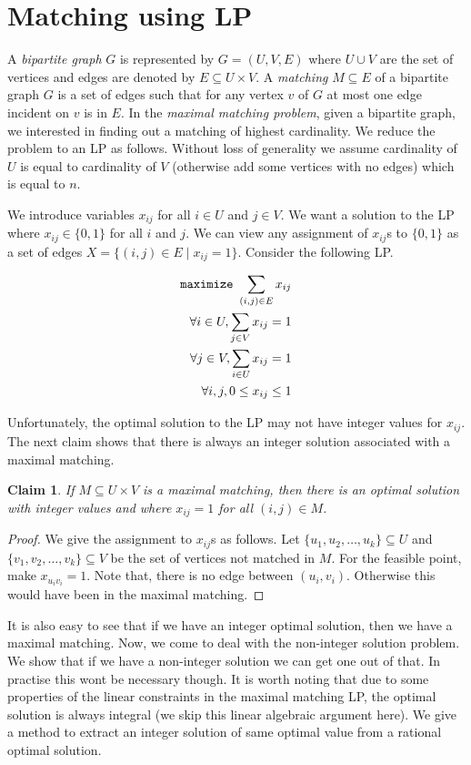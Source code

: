 \documentclass[12pt,
    driverfallback=dvipdfm,
 	openany,
    a4paper,
    toc=bibliography,
    twoside,
    numbers=noenddot]{book}              %
\newtheorem{claim}[theorem]{Claim}
\begin{document}
\section{Matching using LP}
A \emph{bipartite graph} $G$ is represented by $G=(U,V,E)$ where $U \cup V$ are the set of vertices and edges are denoted by $E \subseteq U \times V$. A \emph{matching} $M \subseteq E$ of a bipartite graph $G$ is a set of edges such that for any vertex $v$ of $G$ at most one edge incident on $v$ is in $E$. In the \emph{maximal matching problem}, given a bipartite graph, we interested in finding out a matching of highest cardinality. We reduce the problem to an LP as follows. Without loss of generality we assume cardinality of $U$ is equal to cardinality of $V$ (otherwise add some vertices with no edges) which is equal to $n$. 

We introduce variables $x_{ij}$ for all $i \in U$ and $j \in V$. We want a solution to the LP where $x_{ij} \in \{0,1\}$ for all $i$ and $j$. We can view any assignment of $x_{ij}$s to $\{0,1\}$ as a set of edges $X = \{(i,j) \in E \mid x_{ij}=1\}$. Consider the following LP.

\begin{align*}
\mathtt{maximize} ~\sum_{(i,j) \in E} x_{ij} \\
\forall i \in U, \sum_{j \in V} x_{ij}=1 \\
\forall j \in V, \sum_{i \in U} x_{ij}=1 \\
\forall i,j, 0 \leq x_{ij} \leq 1 
\end{align*}

Unfortunately, the optimal solution to the LP may not have integer values for $x_{ij}$. The next claim shows that there is always an integer solution associated with a maximal matching.
\begin{claim}
If $M \subseteq U \times V$ is a maximal matching, then there is an optimal solution with integer values and where $x_{ij}=1$ for all $(i,j) \in M$.
\end{claim}
\begin{proof}
We give the assignment to $x_{ij}$s as follows. Let $\{u_1, u_2, \dots, u_k \} \subseteq U$ and $\{v_1, v_2, \dots, v_k \} \subseteq V$  be the set of vertices not matched in $M$. For the feasible point, make $x_{u_i v_i} = 1$. Note that, there is no edge between $(u_i,v_i)$. Otherwise this would have been in the maximal matching.
\end{proof}

It is also easy to see that if we have an integer optimal solution, then we have a maximal matching. Now, we come to deal with the non-integer solution problem. We show that if we have a non-integer solution we can get one out of that. In practise this wont be necessary though. It is worth noting that due to some properties of the linear constraints in the maximal matching LP, the optimal solution is always integral (we skip this linear algebraic argument here). We give a method to extract an integer solution of same optimal value from a rational optimal solution.
\end{document}
